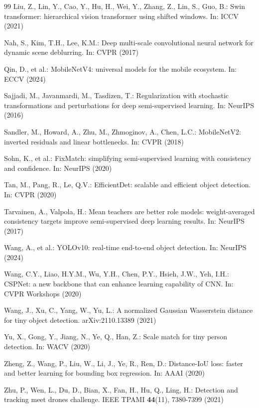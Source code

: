 \begin{thebibliography}{99}
Liu, Z., Lin, Y., Cao, Y., Hu, H., Wei, Y., Zhang, Z., Lin, S., Guo, B.: Swin
transformer: hierarchical vision transformer using shifted windows. In: ICCV
(2021)

Nah, S., Kim, T.H., Lee, K.M.: Deep multi-scale convolutional neural network for
dynamic scene deblurring. In: CVPR (2017)

Qin, D., et al.: MobileNetV4: universal models for the mobile ecosystem. In:
ECCV (2024)

Sajjadi, M., Javanmardi, M., Tasdizen, T.: Regularization with stochastic
transformations and perturbations for deep semi-supervised learning. In:
NeurIPS (2016)

Sandler, M., Howard, A., Zhu, M., Zhmoginov, A., Chen, L.C.: MobileNetV2:
inverted residuals and linear bottlenecks. In: CVPR (2018)

Sohn, K., et al.: FixMatch: simplifying semi-supervised learning with
consistency and confidence. In: NeurIPS (2020)

Tan, M., Pang, R., Le, Q.V.: EfficientDet: scalable and efficient object
detection. In: CVPR (2020)

Tarvainen, A., Valpola, H.: Mean teachers are better role models:
weight-averaged consistency targets improve semi-supervised deep learning
results. In: NeurIPS (2017)

Wang, A., et al.: YOLOv10: real-time end-to-end object detection. In:
NeurIPS (2024)

Wang, C.Y., Liao, H.Y.M., Wu, Y.H., Chen, P.Y., Hsieh, J.W., Yeh, I.H.:
CSPNet: a new backbone that can enhance learning capability of CNN. In: CVPR
Workshops (2020)

Wang, J., Xu, C., Yang, W., Yu, L.: A normalized Gaussian Wasserstein
distance for tiny object detection. arXiv:2110.13389 (2021)

Yu, X., Gong, Y., Jiang, N., Ye, Q., Han, Z.: Scale match for tiny person
detection. In: WACV (2020)

Zheng, Z., Wang, P., Liu, W., Li, J., Ye, R., Ren, D.: Distance-IoU loss:
faster and better learning for bounding box regression. In: AAAI (2020)

Zhu, P., Wen, L., Du, D., Bian, X., Fan, H., Hu, Q., Ling, H.: Detection and
tracking meet drones challenge. IEEE TPAMI \textbf{44}(11), 7380-7399
(2021)

\end{thebibliography}
